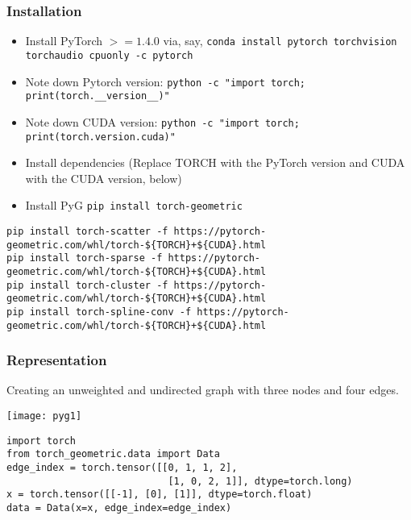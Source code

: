 \begin{frame}[fragile]\frametitle{Installation}

\begin{itemize}
\item Install PyTorch $>= 1.4.0$ via, say, \lstinline|conda install pytorch torchvision torchaudio cpuonly -c pytorch|
\item Note down Pytorch version: \lstinline|python -c "import torch; print(torch.__version__)"|
\item Note down CUDA version: \lstinline|python -c "import torch; print(torch.version.cuda)"|
\item Install dependencies (Replace TORCH with the PyTorch version and CUDA with the CUDA version, below)
\item Install PyG \lstinline|pip install torch-geometric|
\end{itemize}

\begin{lstlisting}
pip install torch-scatter -f https://pytorch-geometric.com/whl/torch-${TORCH}+${CUDA}.html
pip install torch-sparse -f https://pytorch-geometric.com/whl/torch-${TORCH}+${CUDA}.html
pip install torch-cluster -f https://pytorch-geometric.com/whl/torch-${TORCH}+${CUDA}.html
pip install torch-spline-conv -f https://pytorch-geometric.com/whl/torch-${TORCH}+${CUDA}.html 
\end{lstlisting}

\end{frame}

\begin{frame}[fragile]\frametitle{Representation}

Creating an unweighted and undirected graph with three nodes and four edges. 

\begin{center}
\texttt{[image: pyg1]}
\end{center}	  


\begin{lstlisting}
import torch
from torch_geometric.data import Data
edge_index = torch.tensor([[0, 1, 1, 2],
                            [1, 0, 2, 1]], dtype=torch.long)
x = torch.tensor([[-1], [0], [1]], dtype=torch.float)
data = Data(x=x, edge_index=edge_index) 
\end{lstlisting}

\end{frame}

